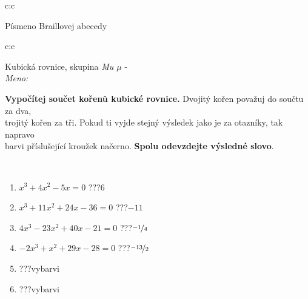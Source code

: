 \documentclass[10pt]{report}
\begin{document}
\begin{tabular}{c:c}
\begin{minipage}[c][104.5mm][t]{0.5\linewidth}
\begin{center}
\begin{minipage}{0.20\linewidth}
\begin{center}
{\small Písmeno Braillovej abecedy}
\end{center}
\end{minipage}
\end{center}
\end{minipage}
%
\end{tabular}
\newpage
\thispagestyle{empty}
\begin{tabular}{c:c}
\begin{minipage}[c][104.5mm][t]{0.5\linewidth}
\begin{center}
\vspace{7mm}
{\huge Kubická rovnice, skupina \textit{Mu $\mu$} -}\\[5mm]
\textit{Meno:}\phantom{xxxxxxxxxxxxxxxxxxxxxxxxxxxxxxxxxxxxxxxxxxxxxxxxxxxxxxxxxxxxxxxxx}\\[5mm]
\begin{minipage}{0.95\linewidth}
\textbf{Vypočítej součet kořenů kubické rovnice.} Dvojitý kořen považuj do součtu za dva,\\trojitý kořen za tři. Pokud ti vyjde stejný výsledek jako je za otazníky, tak napravo\\barvi příslušející kroužek načerno. \textbf{Spolu odevzdejte výsledné slovo}.
\end{minipage}
\\[1mm]
\begin{minipage}{0.79\linewidth}
\begin{center}
\begin{varwidth}{\linewidth}
\begin{enumerate}
\Large
\item $x^3+4x^2-5x=0$\quad \dotfill\; ???\;\dotfill \quad $6$
\item $x^3+11x^2+24x-36=0$\quad \dotfill\; ???\;\dotfill \quad $-11$
\item $4x^3-23x^2+40x-21=0$\quad \dotfill\; ???\;\dotfill \quad $\nicefrac{-1}{4}$
\item $-2x^3+x^2+29x-28=0$\quad \dotfill\; ???\;\dotfill \quad $\nicefrac{-13}{2}$
\item \quad \dotfill\; ???\;\dotfill \quad vybarvi
\item \quad \dotfill\; ???\;\dotfill \quad vybarvi
\end{enumerate}
\end{varwidth}
\end{center}
\end{minipage}
\begin{minipage}{0.20\linewidth}
\begin{center}

\end{center}
\end{minipage}
\end{center}
\end{minipage}
\end{tabular}
\end{document}
